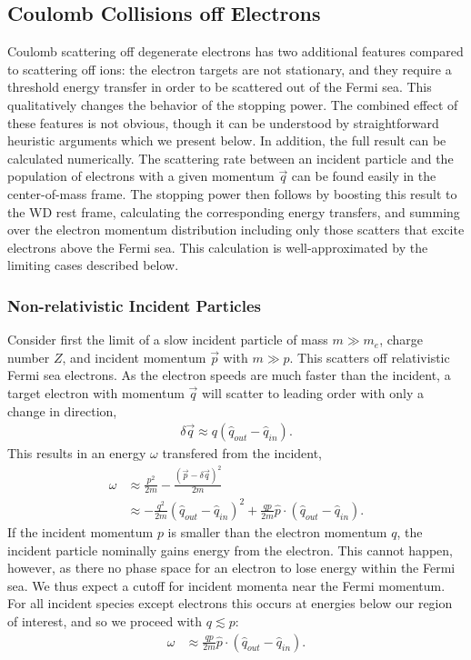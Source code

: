 \documentclass[twocolumn, preprintnumbers,amsmath,amssymb,prd, superscriptaddress]{revtex4}
\begin{document}
\begin{appendices}
\subsection{Coulomb Collisions off Electrons}
\label{sec:coulomb_elec}

Coulomb scattering off degenerate electrons has two additional features compared to scattering off ions: the electron targets are not stationary, and they require a threshold energy transfer in order to be scattered out of the Fermi sea.
This qualitatively changes the behavior of the stopping power.
The combined effect of these features is not obvious, though it can be understood by straightforward heuristic arguments which we present below.
In addition, the full result can be calculated numerically.
The scattering rate between an incident particle and the population of electrons with a given momentum $\vec{q}$ can be found easily in the center-of-mass frame.
The stopping power then follows by boosting this result to the WD rest frame, calculating the corresponding energy transfers, and summing over the electron momentum distribution including only those scatters that excite electrons above the Fermi sea.
This calculation is well-approximated by the limiting cases described below.

\subsubsection{Non-relativistic Incident Particles}
Consider first the limit of a slow incident particle of mass $m \gg m_e$, charge number $Z$, and incident momentum $\vec{p}$ with $m \gg p$.
This scatters off relativistic Fermi sea electrons.
As the electron speeds are much faster than the incident, a target electron with momentum $\vec{q}$ will scatter to leading order with only a change in direction,
\begin{align}
  \delta \vec{q} \approx q \left(\hat{q}_{out} - \hat{q}_{in}\right).
\end{align}
This results in an energy $\omega$ transfered from the incident,
\begin{align}
  \omega &\approx \frac{p^2}{2 m} -
    \frac{\left(\vec{p} - \delta \vec{q}\right)^2}{2 m} \\
    &\approx -\frac{q^2}{2m}  \left(\hat{q}_{out} - \hat{q}_{in}\right)^2
  + \frac{q p}{2m} \hat{p} \cdot \left(\hat{q}_{out} - \hat{q}_{in}\right).
\end{align}
If the incident momentum $p$ is smaller than the electron momentum $q$, the incident particle nominally gains energy from the electron.
This cannot happen, however, as there no phase space for an electron to lose energy within the Fermi sea.
We thus expect a cutoff for incident momenta near the Fermi momentum.
For all incident species except electrons this occurs at energies below our region of interest, and so we proceed with $q \lesssim p$:
\begin{align}
  \omega &\approx \frac{q p}{2m}
  \hat{p} \cdot \left(\hat{q}_{out} - \hat{q}_{in}\right).
\end{align}


\end{appendices}
\end{document}
